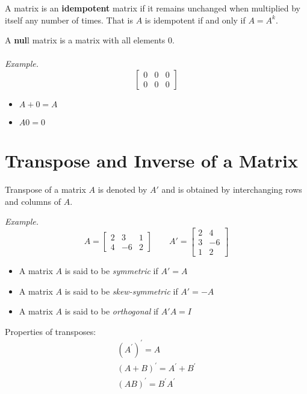 \documentclass{./../Latex/handout}
\begin{document}
A matrix is an \textbf{idempotent} matrix if it remains unchanged when multiplied by itself any number of times. That is $A$ is idempotent if and only if $A = A^k$. 

A \textbf{nul}l matrix is a matrix with all elements $0$. \\~\\
\textit{Example.} $$\begin{bmatrix}
0 & 0 & 0 \\
0 & 0 & 0
\end{bmatrix}$$
\begin{itemize}
\item $A + 0 = A$
\item $A 0 = 0$
\end{itemize}


\section{Transpose and Inverse of a Matrix}

Transpose of a matrix $A$ is denoted by $A'$ and is obtained by interchanging rows and columns of $A$. 

\textit{Example.} $$A = \begin{bmatrix}
2 & 3 & 1 \\
4 & -6 & 2
\end{bmatrix} \quad \quad A' = \begin{bmatrix}
2 & 4 \\
3 & -6 \\
1 & 2
\end{bmatrix}$$

\begin{itemize}
\item A matrix $A$ is said to be \textit{symmetric} if $A'=A$
\item A matrix $A$ is said to be \textit{skew-symmetric} if $A'=-A$
\item A matrix $A$ is said to be \textit{orthogonal} if $A'A=I$
\end{itemize}

Properties of transposes:
$$
\begin{array}{l}
\left(A^{\prime}\right)^{\prime}=A \\
(A+B)^{\prime}=A^{\prime}+B^{\prime} \\
(A B)^{\prime}=B^{\prime} A^{\prime} \\
\end{array}
$$ \\
\end{document}
